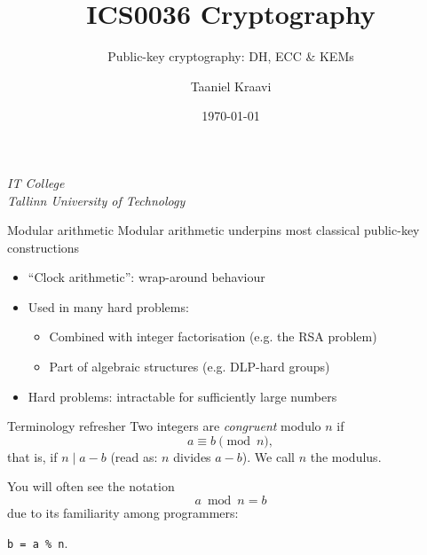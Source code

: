 \graphicspath{ {../../images/} }
\usetikzlibrary{external,arrows.meta}
\usepackage{caption}
\usepackage{pgfplots}
\usepackage{changepage}

\makeatletter
\newcommand{\slidefootnote}[1]{%
  \begin{tikzpicture}[remember picture,overlay]
    \node[anchor=base west,font=\scriptsize,inner sep=0pt]
      at ([xshift=\beamer@leftmargin,yshift=5.2mm]current page.south west) {#1};
  \end{tikzpicture}}
\makeatother

\title{ICS0036 Cryptography}
\subtitle{Public-key cryptography: DH, ECC \& KEMs}
\date{\today}
\author{Taaniel Kraavi}
\institute%
{%
  \textit{IT College}\\
  \textit{Tallinn University of Technology}
}


\begin{frame}
  \titlepage
\end{frame}

\begin{frame}{Modular arithmetic}
  Modular arithmetic underpins most classical public-key constructions
  \begin{itemize}[<+(1)->]
    \item \enquote{Clock arithmetic}: wrap-around behaviour
    \item Used in many hard problems:
    \begin{itemize}
      \item Combined with integer factorisation (e.g. the RSA problem)
      \item Part of algebraic structures (e.g. DLP-hard groups)
    \end{itemize}
    \item Hard problems: intractable for sufficiently large numbers
  \end{itemize}
\end{frame}

\begin{frame}{Terminology refresher}
  Two integers are \emph{congruent} modulo $n$ if
  \[
    a \equiv b \pmod{n},
  \]
  \pause
  that is, if $n \mid a - b$ (read as: $n$ divides $a-b$).
  \pause
  We call $n$ the \alert{modulus}.

  \vspace*{1em}

  \pause
  You will often see the notation
  \[
    a \bmod n = b
  \]
  due to its familiarity among programmers:
  \begin{center}
    \texttt{b = a \% n}.
  \end{center}
\end{frame}

